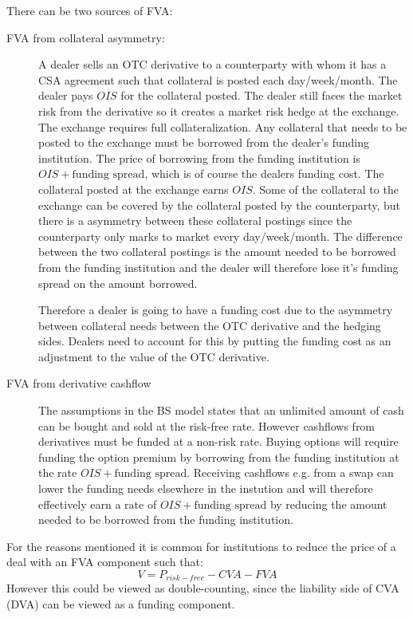 \documentclass[10pt,a4paper]{article}
\begin{document}
        There can be two sources of FVA:
        \begin{description}
            \item[FVA from collateral asymmetry:] A dealer sells an OTC derivative to a counterparty with whom it has a CSA agreement such that collateral is posted each day/week/month. The dealer pays $OIS$ for the collateral posted. The dealer still faces the market risk from the derivative so it creates a market risk hedge at the exchange. The exchange requires full collateralization. Any collateral that needs to be posted to the exchange must be borrowed from the dealer's funding institution. The price of borrowing from the funding institution is $OIS + \text{funding spread}$, which is of course the dealers funding cost. The collateral posted at the exchange earns $OIS$. Some of the collateral to the exchange can be covered by the collateral posted by the counterparty, but there is a asymmetry between these collateral postings since the counterparty only marks to market every day/week/month. The difference between the two collateral postings is the amount needed to be borrowed from the funding institution and the dealer will therefore lose it's funding spread on the amount borrowed. 
            
            Therefore a dealer is going to have a funding cost due to the asymmetry between collateral needs between the OTC derivative and the hedging sides. Dealers need to account for this by putting the funding cost as an adjustment to the value of the OTC derivative.

            \item[FVA from derivative cashflow] The assumptions in the BS model states that an unlimited amount of cash can be bought and sold at the risk-free rate. However cashflows from derivatives must be funded at a non-risk rate. Buying options will require funding the option premium by borrowing from the funding institution at the rate $OIS + \text{funding spread}$. Receiving cashflows e.g. from a swap can lower the funding needs elsewhere in the instution and will therefore effectively earn a rate of $OIS + \text{funding spread}$ by reducing the amount needed to be borrowed from the funding institution.
        \end{description}

        For the reasons mentioned it is common for institutions to reduce the price of a deal with an FVA component such that:
            \begin{equation}
                V = P_{risk-free} - CVA - FVA
            \end{equation}
        However this could be viewed as double-counting, since the liability side of CVA (DVA) can be viewed as a funding component.
        
\end{document}
